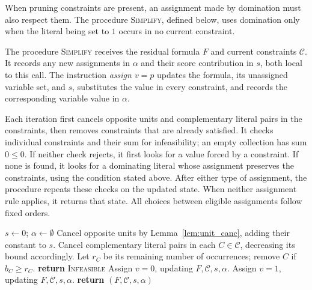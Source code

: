 \documentclass[11pt,a4paper]{article}
\theoremstyle{definition}
\theoremstyle{remark}
\begin{document}
When pruning constraints are present, an assignment made by domination
must also respect them. The procedure \textnormal{\textsc{Simplify}}, defined
below, uses domination only when the literal being set
to $1$ occurs in no current constraint.

The procedure \textnormal{\textsc{Simplify}} receives the residual formula
$F$ and current constraints $\mathcal C$. It records any new assignments
in $\alpha$ and their score contribution in $s$, both local to this call.
The instruction \emph{assign $v=p$} updates the formula, its unassigned
variable set, and $s$, substitutes the value in every constraint, and
records the corresponding variable value in $\alpha$.

Each iteration first cancels opposite units and complementary literal
pairs in the constraints, then removes constraints that are already
satisfied. It checks individual constraints and their sum for
infeasibility; an empty collection has sum $0\le0$. If neither check
rejects, it first looks for a value forced by a constraint. If none is
found, it looks for a dominating literal whose assignment preserves
the constraints, using the condition stated above. After either type
of assignment, the procedure repeats these checks on the updated state.
When neither assignment rule applies, it returns that state. All choices
between eligible assignments follow fixed orders.

\begin{algorithm}[tp]
\caption{\textnormal{\textsc{Simplify}}$(F,\mathcal C)$}\label{alg:simplify}
\begin{algorithmic}[1]
\STATE $s\gets0$; $\alpha\gets\emptyset$
  \STATE Cancel opposite units by Lemma~\ref{lem:unit_canc}, adding their constant to $s$.
  \STATE Cancel complementary literal pairs in each $C\in\mathcal C$, decreasing its bound accordingly.
  \STATE Let $r_C$ be its remaining number of occurrences; remove $C$ if $b_C\ge r_C$.
    \STATE \textbf{return} \textsc{Infeasible}
  \ENDIF
    \STATE Assign $v=0$, updating $F,\mathcal C,s,\alpha$.
    \STATE Assign $v=1$, updating $F,\mathcal C,s,\alpha$.
  \ELSE
    \STATE \textbf{return} $(F,\mathcal C,s,\alpha)$
  \ENDIF
\ENDWHILE
\end{algorithmic}
\end{algorithm}
\end{document}
